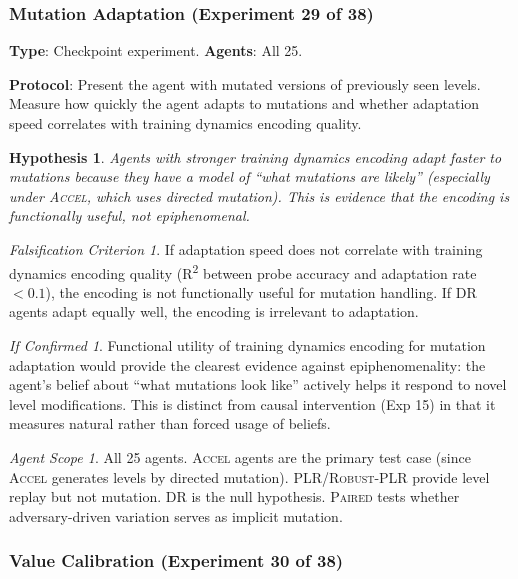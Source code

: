 \documentclass[11pt,a4paper]{article}
\newtheorem{hypothesis}{Hypothesis}[subsection]
\theoremstyle{remark}
\newtheorem*{falsification}{Falsification Criterion}
\newtheorem*{implication}{If Confirmed}
\newtheorem*{agentscope}{Agent Scope}
\newcommand{\paired}{\textsc{Paired}}
\newcommand{\accel}{\textsc{Accel}}
\newcommand{\plr}{\textsc{PLR}}
\newcommand{\dr}{\textsc{DR}}
\newcommand{\rplr}{\textsc{Robust-PLR}}
\begin{document}
\subsubsection{Mutation Adaptation (Experiment 29 of 38)}
\label{exp:mutation_adaptation}

\textbf{Type}: Checkpoint experiment. \textbf{Agents}: All 25.

\textbf{Protocol}: Present the agent with mutated versions of previously seen levels. Measure how quickly the agent adapts to mutations and whether adaptation speed correlates with training dynamics encoding quality.

\begin{hypothesis}
Agents with stronger training dynamics encoding adapt faster to mutations because they have a model of ``what mutations are likely'' (especially under \accel{}, which uses directed mutation). This is evidence that the encoding is functionally useful, not epiphenomenal.
\end{hypothesis}

\begin{falsification}
If adaptation speed does not correlate with training dynamics encoding quality (R\textsuperscript{2} between probe accuracy and adaptation rate $< 0.1$), the encoding is not functionally useful for mutation handling. If \dr{} agents adapt equally well, the encoding is irrelevant to adaptation.
\end{falsification}

\begin{implication}
Functional utility of training dynamics encoding for mutation adaptation would provide the clearest evidence against epiphenomenality: the agent's belief about ``what mutations look like'' actively helps it respond to novel level modifications. This is distinct from causal intervention (Exp 15) in that it measures natural rather than forced usage of beliefs.
\end{implication}

\begin{agentscope}
All 25 agents. \accel{} agents are the primary test case (since \accel{} generates levels by directed mutation). \plr{}/\rplr{} provide level replay but not mutation. \dr{} is the null hypothesis. \paired{} tests whether adversary-driven variation serves as implicit mutation.
\end{agentscope}

\subsubsection{Value Calibration (Experiment 30 of 38)}
\label{exp:value_calibration}
\end{document}
